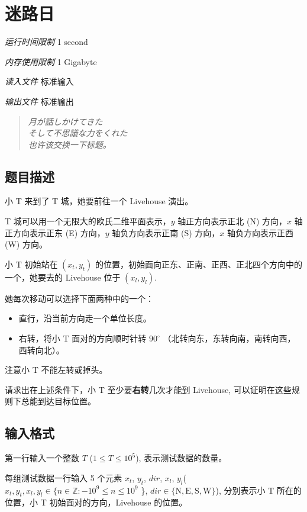 \section[F. 迷路日]{ 迷路日}

\textit{运行时间限制}   1 second

\textit{内存使用限制} 1 Gigabyte

\textit{读入文件} \qquad 标准输入

\textit{输出文件} \qquad 标准输出

\begin{quote}
   \textit{月が話しかけてきた\\
そして不思議な力をくれた\\}
   \textit{也许该交换一下标题。}
\end{quote}

\subsection{题目描述}

小 T 来到了 T 城，她要前往一个 Livehouse 演出。

T 城可以用一个无限大的欧氏二维平面表示，$y$ 轴正方向表示正北 (N) 方向，$x$ 轴正方向表示正东 (E) 方向，$y$ 轴负方向表示正南 (S) 方向，$x$ 轴负方向表示正西 (W) 方向。

小 T 初始站在 $(x_{t}, y_{t})$ 的位置，初始面向正东、正南、正西、正北四个方向中的一个，她要去的 Livehouse 位于 $(x_l, y_l)$.

她每次移动可以选择下面两种中的一个：

\begin{itemize}
   \item 直行，沿当前方向走一个单位长度。
   \item 右转，将小 T 面对的方向顺时针转 $90^\circ$ （北转向东，东转向南，南转向西，西转向北）。
\end{itemize}

注意小 T 不能左转或掉头。

请求出在上述条件下，小 T 至少要\textbf{右转}几次才能到 Livehouse, 可以证明在这些规则下总能到达目标位置。

\subsection{输入格式}

第一行输入一个整数 $T$ ($1 \le T \le 10^5$), 表示测试数据的数量。

每组测试数据一行输入 5 个元素 $x_t$, $y_t$, $dir$, $x_l$, $y_l$($x_t, y_t, x_l, y_l \in \{n \in \mathbb{Z} : -10^9 \le n \le 10^9$ \}, $dir \in \{\text{N}, \text{E}, \text{S}, \text{W}\}$), 分别表示小 T 所在的位置，小 T 初始面对的方向，Livehouse 的位置。

